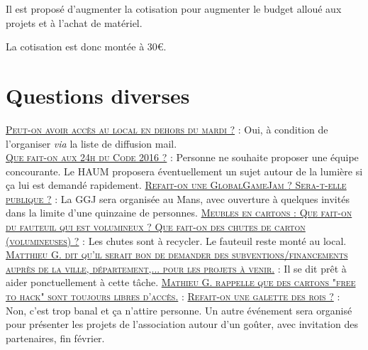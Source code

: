 \documentclass[a4paper, 11pt]{article}
\newcommand\question[1]{\underline{\textsc{#1}} : }
\begin{document}
Il est proposé d'augmenter la cotisation pour augmenter le budget alloué aux projets et à l'achat de matériel.

 La cotisation est donc montée à 30\euro.


\section{Questions diverses}

\question{Peut-on avoir accès au local en dehors du mardi ?} Oui, à condition de l'organiser \textit{via} la liste de diffusion mail.\\
\question{Que fait-on aux 24h du Code 2016 ?} Personne ne souhaite proposer une équipe concourante. Le HAUM proposera éventuellement un sujet autour de la lumière si ça lui est demandé rapidement.
\question{Refait-on une GlobalGameJam ? Sera-t-elle publique ?} La GGJ sera organisée au Mans, avec ouverture à quelques invités dans la limite d'une quinzaine de personnes.
\question{Meubles en cartons : Que fait-on du fauteuil qui est volumineux ? Que fait-on des chutes de carton (volumineuses) ?} Les chutes sont à recycler. Le fauteuil reste monté au local.
\question{Matthieu G. dit qu'il serait bon de demander des subventions/financements auprès de la ville, département,... pour les projets à venir.} Il se dit prêt à aider ponctuellement à cette tâche.
\question{Mathieu G. rappelle que des cartons "free to hack" sont toujours libres d'accès.}
\question{Refait-on une galette des rois ?} Non, c'est trop banal et ça n'attire personne. Un autre événement sera organisé pour présenter les projets de l'association autour d'un goûter, avec invitation des partenaires, fin février.
\end{document}
